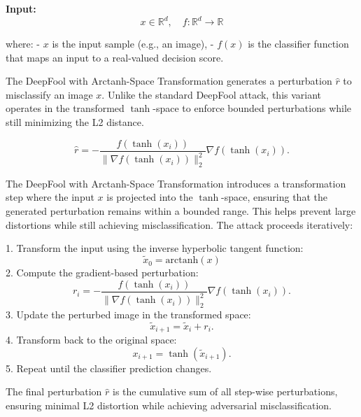 \textbf{Input:}  
\[
x \in \mathbb{R}^d, \quad f: \mathbb{R}^d \to \mathbb{R}
\]

where:  
- \( x \) is the input sample (e.g., an image),  
- \( f(x) \) is the classifier function that maps an input to a real-valued decision score.

The DeepFool with Arctanh-Space Transformation generates a perturbation \( \hat{r} \) to misclassify an image \( x \). Unlike the standard DeepFool attack, this variant operates in the transformed \(\tanh\)-space to enforce bounded perturbations while still minimizing the L2 distance.

\[
\hat{r} = -\frac{f(\tanh(x_i))}{\|\nabla f(\tanh(x_i))\|_2^2} \nabla f(\tanh(x_i)).
\]

The DeepFool with Arctanh-Space Transformation introduces a transformation step where the input \( x \) is projected into the \(\tanh\)-space, ensuring that the generated perturbation remains within a bounded range. This helps prevent large distortions while still achieving misclassification. The attack proceeds iteratively:

1. Transform the input using the inverse hyperbolic tangent function:
   \[
   \tilde{x}_0 = \text{arctanh}(x)
   \]
2. Compute the gradient-based perturbation:
   \[
   r_i = -\frac{f(\tanh(x_i))}{\|\nabla f(\tanh(x_i))\|_2^2} \nabla f(\tanh(x_i)).
   \]
3. Update the perturbed image in the transformed space:
   \[
   \tilde{x}_{i+1} = \tilde{x}_i + r_i.
   \]
4. Transform back to the original space:
   \[
   x_{i+1} = \tanh(\tilde{x}_{i+1}).
   \]
5. Repeat until the classifier prediction changes.

The final perturbation \( \hat{r} \) is the cumulative sum of all step-wise perturbations, ensuring minimal L2 distortion while achieving adversarial misclassification.
